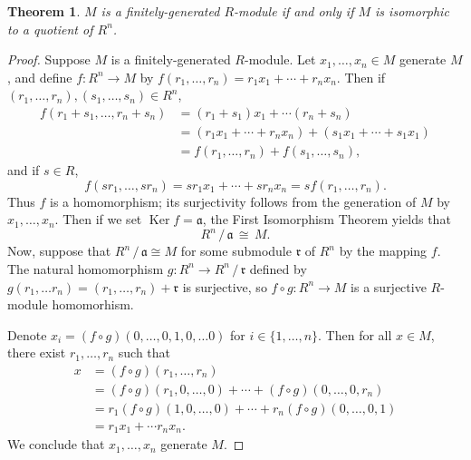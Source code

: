 \documentclass[11pt]{article}
\newtheorem{theorem}{Theorem}
\newcommand{\Ker}{\operatorname{Ker}}
\begin{document}
\begin{adjustwidth}{1cm}{}
	\begin{theorem}
		$M$ is a finitely-generated $R$-module if and only if $M$ is isomorphic to a quotient of $R^{n}$.
	\end{theorem}
	\begin{proof}
		Suppose $M$ is a finitely-generated $R$-module. Let $x_{1}, \ldots, x_{n} \in M$ generate $M$, and define $f : R^{n} \to M$ by $f(r_{1}, \ldots, r_{n}) = r_{1}x_{1} + \cdots + r_{n}x_{n}$. Then if $(r_{1}, \ldots, r_{n}), (s_{1}, \ldots, s_{n}) \in R^{n}$,
		\begin{align*}
			f(r_{1} + s_{1}, \ldots, r_{n} + s_{n}) &= (r_{1} + s_{1}) x_{1} + \cdots(r_{n} + s_{n}) \\
			&= (r_{1}x_{1} + \cdots + r_{n}x_{n}) + (s_{1}x_{1} + \cdots + s_{1}x_{1}) \\
			&= f(r_{1}, \ldots, r_{n}) + f(s_{1}, \ldots, s_{n}),
		\end{align*}
		and if $s \in R$,
		\[
			f(s r_{1}, \ldots, s r_{n}) = s r_{1} x_{1} + \cdots + s r_{n} x_{n} = s f(r_{1}, \ldots, r_{n}).
		\]
		Thus $f$ is a homomorphism; its surjectivity follows from the generation of $M$ by $x_{1}, \ldots, x_{n}$. Then if we set $\Ker f = \mathfrak{a}$, the First Isomorphism Theorem yields that
		\[
			R^{n} \,/\, \mathfrak{a} \, \cong \, M.
		\]
		Now, suppose that $R^{n} \,/\, \mathfrak{a} \cong M$ for some submodule $\mathfrak{r}$ of $R^{n}$ by the mapping $f$. The natural homomorphism $g : R^{n} \to R^{n} \,/\, \mathfrak{r}$ defined by $g(r_{1}, \ldots r_{n}) = (r_{1}, \ldots, r_{n}) + \mathfrak{r}$ is surjective, so $f \circ g : R^{n} \to M$ is a surjective $R$-module homomorhism.

		Denote $x_{i} = (f \circ g) (0, \ldots, 0, 1, 0, \ldots 0)$ for $i \in \{ 1, \ldots, n \}$. Then for all $x \in M$, there exist $r_{1}, \ldots, r_{n}$ such that
		\begin{align*}
			x &= (f \circ g)(r_{1}, \ldots, r_{n}) \\
			&= (f \circ g)(r_{1}, 0, \ldots, 0) + \cdots + (f \circ g)(0, \ldots, 0, r_{n}) \\
			&= r_{1} (f \circ g)(1, 0, \ldots, 0) + \cdots + r_{n} (f \circ g)(0, \ldots, 0, 1) \\
			&= r_{1} x_{1} + \cdots r_{n} x_{n}.
		\end{align*}
		We conclude that $x_{1}, \ldots, x_{n}$ generate $M$.
	\end{proof}
\end{adjustwidth}
\end{document}

